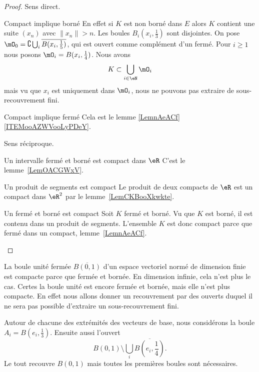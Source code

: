 \begin{proof}
    Sens direct.
    \begin{subproof}
    \item[Compact implique borné]
        En effet si \( K\) est non borné dans \( E\) alors \( K\) contient une suite \( (x_n)\) avec \( \| x_n \|>n\). Les boules \( B_i(x_i,\frac{ 1 }{3})\) sont disjointes. On pose \( \mO_0=\complement\bigcup_i\overline{ B(x_i,\frac{1}{ 5 }) }\), qui est ouvert comme complément d'un fermé. Pour \( i\geq 1\) nous posons \( \mO_i=B(x_i,\frac{1}{ 4 })\). Nous avons
        \begin{equation}
            K\subset\bigcup_{i\in \eN}\mO_i
        \end{equation}
        mais vu que \( x_i\) est uniquement dans \( \mO_i\), nous ne pouvons pas extraire de sous-recouvrement fini.
    \item[Compact implique fermé]
        Cela est le lemme \ref{LemnAeACf}\ref{ITEMooAZWVooLyPDeY}.
    \end{subproof}
    Sens réciproque.
    \begin{subproof}
    \item[Un intervalle fermé et borné est compact dans \( \eR\)]
        C'est le lemme~\ref{LemOACGWxV}.
    \item[Un produit de segments est compact]
        Le produit de deux compacts de \( \eR\) est un compact dans \( \eR^2\) par le lemme~\ref{LemCKBooXkwkte}.
    \item[Un fermé et borné est compact]
        Soit \( K\) fermé et borné. Vu que \( K\) est borné, il est contenu dans un produit de segments. L'ensemble \( K\) est donc compact parce que fermé dans un compact, lemme~\ref{LemnAeACf}.
    \end{subproof}
\end{proof}

\begin{example}
    La boule unité fermée \( \overline{ B(0,1) }\) d'un espace vectoriel normé de dimension finie est compacte parce que fermée et bornée. En dimension infinie, cela n'est plus le cas. Certes la boule unité est encore fermée et bornée, mais elle n'est plus compacte. En effet nous allons donner un recouvrement par des ouverts duquel il ne sera pas possible d'extraire un sous-recouvrement fini.

    Autour de chacune des extrémités des vecteurs de base, nous considérons la boule \( A_i=B(e_i,\frac{1}{ 3 })\). Ensuite aussi l'ouvert
    \begin{equation}
        B(0,1)\setminus\bigcup_i\overline{ B(e_i,\frac{1}{ 4 })}.
    \end{equation}
    Le tout recouvre \( B(0,1)\) mais toutes les premières boules sont nécessaires.
\end{example}

